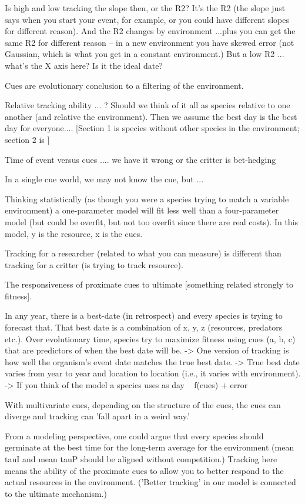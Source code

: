\documentclass[11pt,letterpaper]{article}
\begin{document}
Is high and low tracking the slope then, or the R2? It's the R2 (the slope just says when you start your event, for example, or you could have different slopes for different reason). And the R2 changes by environment ...plus you can get the same R2 for different reason --  in a new environment you have skewed error (not Gaussian, which is what you get in a constant environment.) But a low R2 ... what's the X axis here? Is it the ideal date? 

Cues are evolutionary conclusion to a filtering of the environment. 

Relative tracking ability ... ? Should we think of it all as species relative to one another (and relative the environment). Then we assume the best day is the best day for everyone.... [Section 1 is species without other species in the environment; section 2 is ]

Time of event versus cues .... we have it wrong or the critter is bet-hedging

In a single cue world, we may not know the cue, but ...

Thinking statistically (as though you were a species trying to match a variable environment) a one-parameter model will fit less well than a four-parameter model (but could be overfit, but not too overfit since there are real costs). In this model, y is the resource, x is the cues. 

Tracking for a researcher (related to what you can measure) is different than tracking for a critter (is trying to track resource). 

The responsiveness of proximate cues to ultimate [something related strongly to fitness].

In any year, there is a best-date (in retrospect) and every species is trying to forecast that. That best date is a combination of x, y, z (resources, predators etc.). Over evolutionary time, species try to maximize fitness using cues (a, b, c) that are predictors of when the best date will be. 
-> One version of tracking is how well the organism's event date matches the true best date.
-> True best date varies from year to year and location to location (i.e., it varies with environment). 
-> If you think of the model a species uses as day ~ f(cues) + error


With multivariate cues, depending on the structure of the cues, the cues can diverge and tracking can 'fall apart in a weird way.' 

From a modeling perspective, one could argue that every species should germinate at the best time for the long-term average for the environment (mean tauI and mean tauP should be aligned without competition.) Tracking here means the ability of the proximate cues to allow you to better respond to the actual resources in the environment. ('Better tracking' in our model is connected to the ultimate mechanism.)
\end{document}
